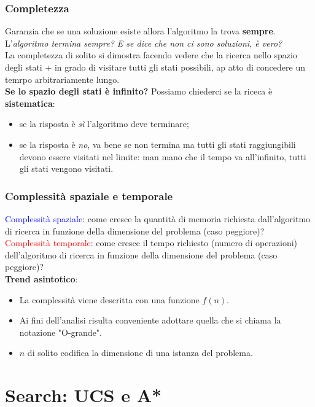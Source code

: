 \documentclass{article}
\begin{document}
\subsubsection{Completezza}
Garanzia che se una soluzione esiste allora l'algoritmo la trova \textbf{sempre}. \\ L'\textit{algoritmo termina sempre? E se dice che non ci sono soluzioni, è vero?} \\
La completezza di solito si dimostra facendo vedere che la ricerca nello spazio degli stati + in grado di visitare tutti gli stati possibili, ap atto di concedere un temrpo arbitrariamente lungo.
\\ \textbf{Se lo spazio degli stati è infinito?} Possiamo chiederci se la riceca è \textbf{sistematica}:
\begin{itemize}
    \item se la risposta è \textit{sì} l'algoritmo deve terminare;
    \item se la risposta è \textit{no}, va bene se non termina ma tutti gli stati raggiungibili devono essere visitati nel limite: man mano che il tempo va all'infinito, tutti gli stati vengono visitati.
\end{itemize}

\subsubsection{Complessità spaziale e temporale}
\textcolor{blue}{Complessità spaziale}: come cresce la quantità di memoria richiesta dall'algoritmo di ricerca in funzione della dimensione del problema (caso peggiore)?\\ \textcolor{red}{Complessità temporale}: come cresce il tempo richiesto (numero di operazioni) dell'algoritmo di ricerca in funzione della dimensione del problema (caso peggiore)?
\\ \textbf{Trend asintotico}:
\begin{itemize}
    \item La complessità viene descritta con una funzione $f(n)$.
    \item Ai fini dell'analisi risulta conveniente adottare quella che si chiama la notazione "O-grande".
    \item $n$ di solito codifica la dimensione di una istanza del problema.
\end{itemize}
\section{Search: UCS e A*}
\end{document}
